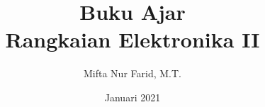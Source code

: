 \documentclass[a4paper,11pt, twoside]{book}
\theoremstyle{definition}
\begin{document}
	
	\author{Mifta Nur Farid, M.T.}

	\title{Buku Ajar \\ Rangkaian Elektronika II}

	\date{Januari 2021}
	
	\frontmatter

	\maketitle

	\tableofcontents
	
	\mainmatter
	
	
	
	
	\backmatter
	
\end{document}
